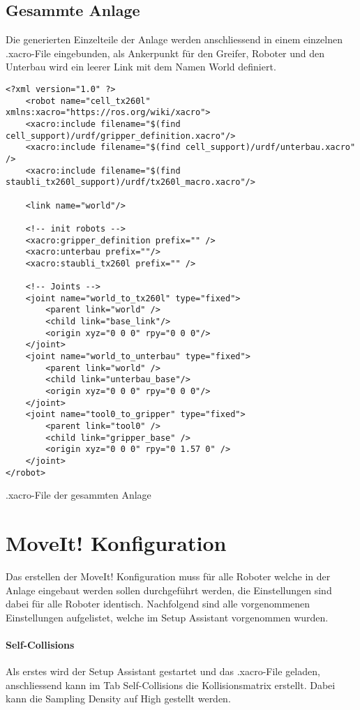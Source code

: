 \subsection{Gesammte Anlage}
Die generierten Einzelteile der Anlage werden anschliessend in einem einzelnen .xacro-File eingebunden, als Ankerpunkt für den Greifer, Roboter und den Unterbau wird ein leerer Link mit dem Namen World definiert.
\begin{code}
	\begin{verbatim}
<?xml version="1.0" ?>
	<robot name="cell_tx260l" xmlns:xacro="https://ros.org/wiki/xacro">
	<xacro:include filename="$(find cell_support)/urdf/gripper_definition.xacro"/>
	<xacro:include filename="$(find cell_support)/urdf/unterbau.xacro" />
	<xacro:include filename="$(find staubli_tx260l_support)/urdf/tx260l_macro.xacro"/>
	
	<link name="world"/>
	
	<!-- init robots -->
	<xacro:gripper_definition prefix="" />
	<xacro:unterbau prefix=""/>
	<xacro:staubli_tx260l prefix="" />
	
	<!-- Joints -->
	<joint name="world_to_tx260l" type="fixed">
		<parent link="world" />
		<child link="base_link"/>
		<origin xyz="0 0 0" rpy="0 0 0"/>
	</joint>  
	<joint name="world_to_unterbau" type="fixed">
		<parent link="world" />
		<child link="unterbau_base"/>
		<origin xyz="0 0 0" rpy="0 0 0"/>
	</joint> 
	<joint name="tool0_to_gripper" type="fixed">
		<parent link="tool0" />
		<child link="gripper_base" />
		<origin xyz="0 0 0" rpy="0 1.57 0" />
	</joint>
</robot>	
	\end{verbatim}
	\vspace{-10pt}
	\caption{.xacro-File der gesammten Anlage}
	\label{code:xacroAnlage}
\end{code}

\section{MoveIt! Konfiguration}\label{sec:MoveitSetup}
Das erstellen der MoveIt! Konfiguration muss für alle Roboter welche in der Anlage eingebaut werden sollen durchgeführt werden, die Einstellungen sind dabei für alle Roboter identisch. Nachfolgend sind alle vorgenommenen Einstellungen aufgelistet, welche im Setup Assistant vorgenommen wurden.\\
\paragraph{Self-Collisions}
Als erstes wird der Setup Assistant gestartet und das .xacro-File geladen, anschliessend kann im Tab Self-Collisions die Kollisionsmatrix erstellt. Dabei kann die Sampling Density auf High gestellt werden.
